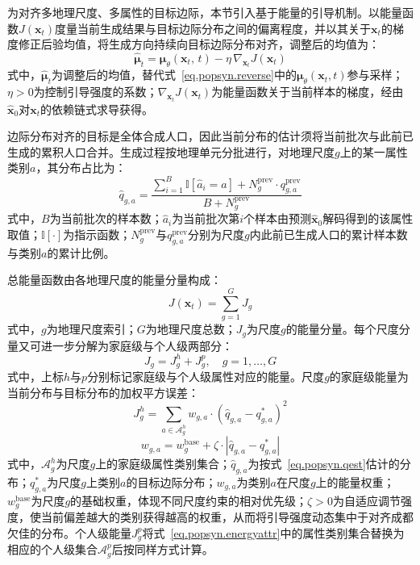 为对齐多地理尺度、多属性的目标边际，本节引入基于能量的引导机制\cite{yuFreedomTrainingfreeEnergyguided2023}。以能量函数$J(\mathbf{x}_t)$度量当前生成结果与目标边际分布之间的偏离程度，并以其关于$\mathbf{x}_t$的梯度修正后验均值，将生成方向持续向目标边际分布对齐，调整后的均值为：
\begin{equation}
  \hat{\boldsymbol{\mu}}_t = \boldsymbol{\mu}_{\theta}\left(\mathbf{x}_t,\, t\right) - \eta\, \nabla_{\mathbf{x}_t} J\left(\mathbf{x}_t\right)
  \label{eq.popsyn.guidedmean}
\end{equation}
式中，$\hat{\boldsymbol{\mu}}_t$为调整后的均值，替代式~\eqref{eq.popsyn.reverse}中的$\boldsymbol{\mu}_{\theta}(\mathbf{x}_t, t)$参与采样；$\eta > 0$为控制引导强度的系数；$\nabla_{\mathbf{x}_t} J(\mathbf{x}_t)$为能量函数关于当前样本的梯度，经由$\hat{\mathbf{x}}_0$对$\mathbf{x}_t$的依赖链式求导获得。
 
边际分布对齐的目标是全体合成人口，因此当前分布的估计须将当前批次与此前已生成的累积人口合并。生成过程按地理单元分批进行，对地理尺度$g$上的某一属性类别$a$，其分布占比为：
\begin{equation}
  \hat{q}_{g, a} = \frac{\sum_{i=1}^{B} \mathbb{I}\left[\hat{a}_i = a\right] + N_{g}^{\mathrm{prev}} \cdot q_{g, a}^{\mathrm{prev}}}{B + N_{g}^{\mathrm{prev}}}
  \label{eq.popsyn.qest}
\end{equation}
式中，$B$为当前批次的样本数；$\hat{a}_i$为当前批次第$i$个样本由预测$\hat{\mathbf{x}}_0$解码得到的该属性取值；$\mathbb{I}[\cdot]$为指示函数；$N_{g}^{\mathrm{prev}}$与$q_{g, a}^{\mathrm{prev}}$分别为尺度$g$内此前已生成人口的累计样本数与类别$a$的累计比例。

总能量函数由各地理尺度的能量分量构成：
\begin{equation}
  J\left(\mathbf{x}_t\right) = \sum_{g=1}^{G} J_{g}
  \label{eq.popsyn.energytotal}
\end{equation}
式中，$g$为地理尺度索引；$G$为地理尺度总数；$J_{g}$为尺度$g$的能量分量。每个尺度分量又可进一步分解为家庭级与个人级两部分：
\begin{equation}
  J_{g} = J_{g}^{h} + J_{g}^{p}, \quad g = 1, \ldots, G
  \label{eq.popsyn.energyscale}
\end{equation}
式中，上标$h$与$p$分别标记家庭级与个人级属性对应的能量。尺度$g$的家庭级能量为当前分布与目标分布的加权平方误差：
\begin{equation}
  J_{g}^{h} = \sum_{a \in \mathcal{A}_{g}^{h}} w_{g, a} \cdot \left(\hat{q}_{g, a} - q_{g, a}^{*}\right)^{2}
  \label{eq.popsyn.energyattr}
\end{equation}
\begin{equation}
  w_{g, a} = w_{g}^{\mathrm{base}} + \zeta \cdot \left|\hat{q}_{g, a} - q_{g, a}^{*}\right|
  \label{eq.popsyn.energyweight}
\end{equation}
式中，$\mathcal{A}_{g}^{h}$为尺度$g$上的家庭级属性类别集合；$\hat{q}_{g, a}$为按式~\eqref{eq.popsyn.qest}估计的分布；$q_{g, a}^{*}$为尺度$g$上类别$a$的目标边际分布；$w_{g, a}$为类别$a$在尺度$g$上的能量权重；$w_{g}^{\mathrm{base}}$为尺度$g$的基础权重，体现不同尺度约束的相对优先级；$\zeta > 0$为自适应调节强度，使当前偏差越大的类别获得越高的权重，从而将引导强度动态集中于对齐成都欠佳的分布。个人级能量$J_{g}^{p}$将式~\eqref{eq.popsyn.energyattr}中的属性类别集合替换为相应的个人级集合$\mathcal{A}_{g}^{p}$后按同样方式计算。
 
